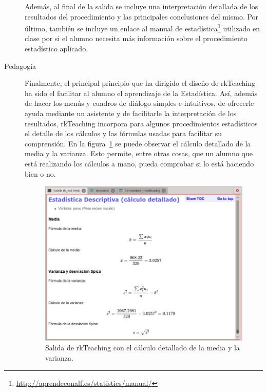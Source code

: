 \documentclass[a4paper,10pt,twoside]{article}
\newcommand{\rkteaching}{\textsf{rkTeaching}}
\begin{document}
\begin{description}
Además, al final de la salida se incluye una interpretación detallada de los resultados del procedimiento y las
principales conclusiones del mismo.
Por último, también se incluye un enlace al manual de estadística\footnote{\url{http://aprendeconalf.es/statistics/manual/}} utilizado en
clase por si el alumno necesita más información sobre el procedimiento estadístico aplicado. 

\item[Pedagogía] Finalmente, el principal principio que ha dirigido el diseño de \rkteaching{} ha sido el facilitar al
alumno el aprendizaje de la Estadística.
Así, además de hacer los menús y cuadros de diálogo simples e intuitivos, de ofrecerle ayuda mediante un asistente y de
facilitarle la interpretación de los resultados, \rkteaching{} incorpora para algunos procedimientos estadísticos el
detalle de los cálculos y las fórmulas usadas para facilitar su comprensión.
En la figura~\ref{f:calculo-detallado} se puede observar el cálculo detallado de la media y la varianza.
Esto permite, entre otras cosas, que un alumno que está realizando los cálculos a mano, pueda comprobar si lo está
haciendo bien o no.

\begin{figure}[htp]
\begin{center}
\includegraphics[width=\textwidth]{img/calculo_detallado.png}
\caption{Salida de \rkteaching{} con el cálculo detallado de la media y la varianza.}
\label{f:calculo-detallado}
\end{center}
\end{figure}


\end{description}
\end{document}
